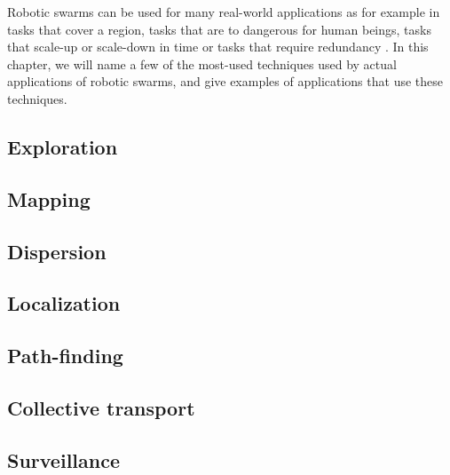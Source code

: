 Robotic swarms can be used for many real-world applications as for example in tasks that cover a region, tasks that are to dangerous for human beings, tasks that scale-up or scale-down in time or tasks that require redundancy \cite{csahin2005swarm}. In this chapter, we will name a few of the most-used techniques used by actual applications of robotic swarms, and give examples of applications that use these techniques.

  \subsection{Exploration}
  
  
  \subsection{Mapping}
  
  
  \subsection{Dispersion}
 

  \subsection{Localization}
 

 \subsection{Path-finding}
 

\subsection{Collective transport}


\subsection{Surveillance}


